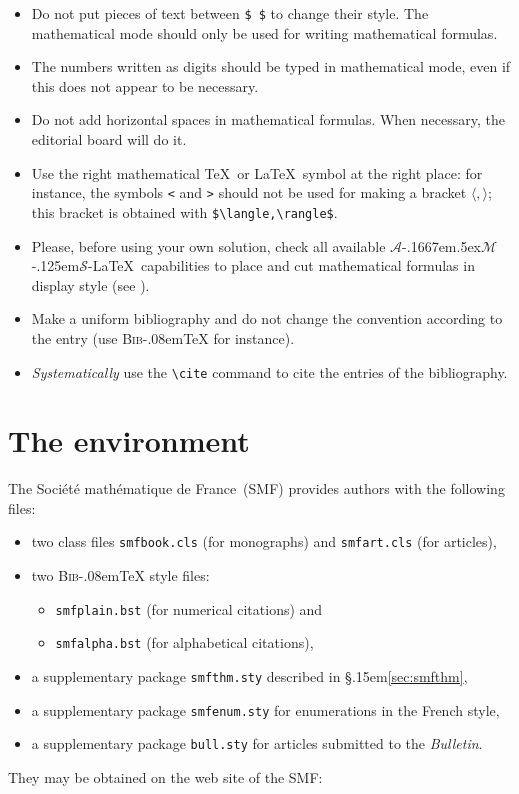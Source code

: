\documentclass[11pt,english]{smfart}
\newcommand{\SmF}{Soci\'et\'e ma\-th\'e\-ma\-ti\-que de France}
\newcommand{\BibTeX}{{\scshape Bib}\kern-.08em\TeX}
\newcommand{\T}{\S\kern .15em\relax }
\newcommand{\AMS}{$\mathcal{A}$\kern-.1667em\lower.5ex\hbox
        {$\mathcal{M}$}\kern-.125em$\mathcal{S}$}
\begin{document}

\begin{itemize}
\item
Do not put pieces of text between \verb|$ $| to change their style.
The mathematical mode should only be used for writing mathematical formulas.

\item
The numbers written as digits should be typed in mathematical mode, even if this does not appear to be necessary.

\item
Do not add horizontal spaces in mathematical formulas.
When necessary, the editorial board will do it.

\item
Use the right mathematical \TeX\ or \LaTeX\ symbol at the right place: for instance, the symbols \verb|<| and \verb|>| should not be used for making a bracket $\langle,\rangle$; this bracket is obtained with
\verb|$\langle,\rangle$|.

\item
Please, before using your own solution, check all available \AMS-\LaTeX\ capabilities to place and cut mathematical formulas in display style (see \cite{amslatex}).
\end{itemize}

\begin{itemize}
\item
Make a uniform bibliography and do not change the convention according to the entry (use {\BibTeX} for instance).
\item
{\em Systematically} use the \verb|\cite| command to cite the entries of the bibliography.
\end{itemize}

\section{The environment}

The \SmF\ (SMF) provides authors with the following files:
\begin{itemize}
\item
two class files \texttt{smfbook.cls} (for monographs) and \texttt{smfart.cls} (for articles),
\item
two {\BibTeX} style files:
\begin{itemize}
\item
\texttt{smfplain.bst} (for numerical citations) and 
\item
\texttt{smfalpha.bst} (for alphabetical citations),
\end{itemize}
\item
a supplementary package \texttt{smfthm.sty} described in \T\ref{sec:smfthm},
\item
a supplementary package \texttt{smfenum.sty} for enumerations in the French style,
\item
a supplementary package \texttt{bull.sty} for articles submitted to the \textsl{Bulletin}.
\end{itemize}
They may be obtained on the web site of the SMF:
\end{document}
